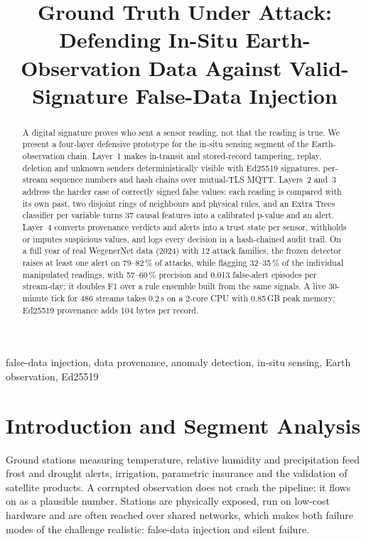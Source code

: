 \documentclass[conference]{IEEEtran}
\begin{document}
\title{Ground Truth Under Attack: Defending In-Situ Earth-Observation Data Against Valid-Signature False-Data Injection}

\author{
}

\maketitle

\begin{abstract}
A digital signature proves who sent a sensor reading, not that the reading is true. We present a four-layer
defensive prototype for the in-situ sensing segment of the Earth-observation chain. Layer~1 makes in-transit
and stored-record tampering, replay, deletion and unknown senders deterministically visible with Ed25519
signatures, per-stream sequence numbers and hash chains over mutual-TLS MQTT. Layers~2 and~3 address the
harder case of correctly signed false values: each reading is compared with its own past, two disjoint rings
of neighbours and physical rules, and an Extra Trees classifier per variable turns 37 causal features into a
calibrated p-value and an alert. Layer~4 converts provenance verdicts and alerts into a trust state per
sensor, withholds or imputes suspicious values, and logs every decision in a hash-chained audit trail. On a
full year of real WegenerNet data (2024) with 12 attack families, the frozen detector raises at least one alert on 79--82\,\%
of attacks, while flagging 32--35\,\% of the individual manipulated readings, with 57--60\,\% precision and
0.013 false-alert episodes per stream-day; it doubles F1 over a rule ensemble built from the same signals. A live 30-minute tick for 486
streams takes 0.2\,s on a 2-core CPU with 0.85\,GB peak memory; Ed25519 provenance adds 104 bytes per
record.
\end{abstract}

\begin{IEEEkeywords}
false-data injection, data provenance, anomaly detection, in-situ sensing, Earth observation, Ed25519
\end{IEEEkeywords}

\section{Introduction and Segment Analysis}

Ground stations measuring temperature, relative humidity and precipitation feed frost and drought alerts,
irrigation, parametric insurance and the validation of satellite products. A corrupted observation does not
crash the pipeline: it flows on as a plausible number. Stations are physically exposed, run on low-cost
hardware and are often reached over shared networks, which makes both failure modes of the challenge
realistic: false-data injection and silent failure.
\end{document}

